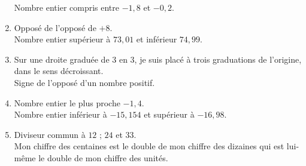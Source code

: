 \begin{enigme}
\begin{multicols}{2}
\begin{enumerate}
                Nombre entier compris entre $-1,8$ et $-0,2$. \\
            \item Opposé de l’opposé de $+8$. \\
                Nombre entier supérieur à $73,01$ et inférieur $74,99$. \\
            \item Sur une droite graduée de $3$ en $3$, je suis placé à trois graduations de l'origine, dans le sens décroissant. \\
                Signe de l’opposé d'un nombre positif. \\
            \item Nombre entier le plus proche $-1,4$. \\
                Nombre entier inférieur à $-15,154$ et supérieur à $-16,98$. \\
            \item Diviseur commun à $12$ ; $24$ et $33$. \\
                Mon chiffre des centaines est le double de mon chiffre des dizaines qui est lui-même le double de mon chiffre des unités. \\ [1mm]
        \end{enumerate}
        

\end{multicols}
\end{enigme}
